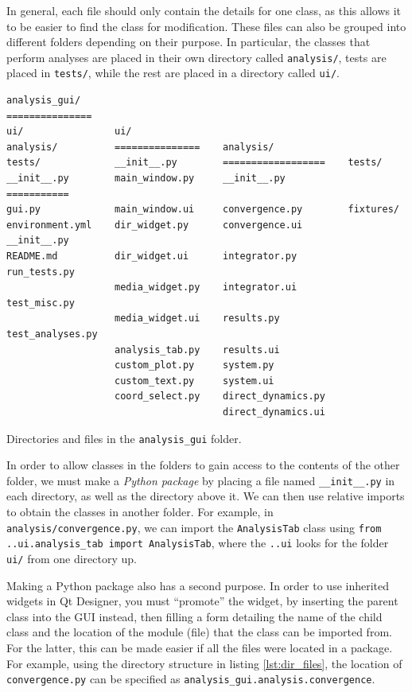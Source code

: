 \documentclass[12pt]{article}
\newenvironment{code}{\captionsetup{type=listing}}{\par\addvspace{\baselineskip}}
\begin{document}
In general, each file should only contain the details for one class, as this allows it to be easier to find the class for modification. These files can also be grouped into different folders depending on their purpose. In particular, the classes that perform analyses are placed in their own directory called \texttt{analysis/}, tests are placed in \texttt{tests/}, while the rest are placed in a directory called \texttt{ui/}.

\begin{code}\begin{verbatim}
analysis_gui/
===============
ui/                ui/                                    
analysis/          ===============    analysis/             
tests/             __init__.py        ==================    tests/
__init__.py        main_window.py     __init__.py           ===========
gui.py             main_window.ui     convergence.py        fixtures/
environment.yml    dir_widget.py      convergence.ui        __init__.py
README.md          dir_widget.ui      integrator.py         run_tests.py
                   media_widget.py    integrator.ui         test_misc.py
                   media_widget.ui    results.py            test_analyses.py
                   analysis_tab.py    results.ui
                   custom_plot.py     system.py
                   custom_text.py     system.ui
                   coord_select.py    direct_dynamics.py
                                      direct_dynamics.ui
\end{verbatim}
\caption{Directories and files in the \texttt{analysis\_gui} folder.}
\label{lst:dir_files}
\end{code}

In order to allow classes in the folders to gain access to the contents of the other folder, we must make a \textit{Python package} by placing a file named \texttt{\_\_init\_\_.py} in each directory, as well as the directory above it. We can then use relative imports to obtain the classes in another folder. For example, in \texttt{analysis/convergence.py}, we can import the \texttt{AnalysisTab} class using \texttt{from ..ui.analysis_tab import AnalysisTab}, where the \texttt{..ui} looks for the folder \texttt{ui/} from one directory up.

Making a Python package also has a second purpose. In order to use inherited widgets in Qt Designer, you must ``promote'' the widget, by inserting the parent class into the GUI instead, then filling a form detailing the name of the child class and the location of the module (file) that the class can be imported from. For the latter, this can be made easier if all the files were located in a package. For example, using the directory structure in listing \ref{lst:dir_files}, the location of \texttt{convergence.py} can be specified as \texttt{analysis\_gui.analysis.convergence}.
\end{document}
